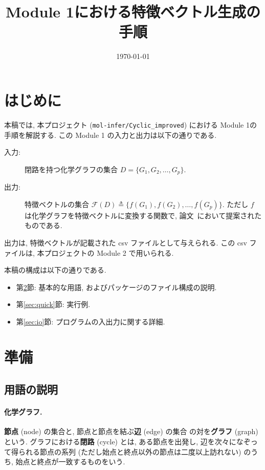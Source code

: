 \documentclass[11pt, titlepage, dvipdfmx, twoside]{jarticle}
\title{\huge Module 1における特徴ベクトル生成の手順}
\author{\project}
\newcommand{\project}{{\tt mol-infer/Cyclic\_improved}}
\newcommand{\secref}[1]{第\ref{sec:#1}節}
\begin{document}
\makeatletter 
\let\c@lstlisting\c@figure
\makeatother
{}
\date{\today}
\maketitle
\thispagestyle{empty}
\tableofcontents
\clearpage
{}


\section{はじめに}
本稿では, 本プロジェクト (\project) における Module 1の手順を解説する. 
この Module 1 の入力と出力は以下の通りである. 

\begin{oframed}
\begin{description}
\item[入力:] 閉路を持つ化学グラフの集合 $D=\{G_1,G_2,\dots,G_p\}$. 
\item[出力:] 特徴ベクトルの集合 ${\mathcal F}(D)\triangleq\{f(G_1),f(G_2),\dots,f(G_p)\}$.
  ただし $f$ は化学グラフを特徴ベクトルに変換する関数で,
  論文~\cite{BH_cyclic_arxiv}において提案されたものである. 
\end{description}
\end{oframed}
出力は, 特徴ベクトルが記載された csv ファイルとして与えられる.
この csv ファイルは, 本プロジェクトの Module 2 で用いられる. 

本稿の構成は以下の通りである. 
\begin{itemize}
\item \secref{preparation}: 基本的な用語, およびパッケージのファイル構成の説明. 
\item \secref{quick}: 実行例. 
\item \secref{io}: プログラムの入出力に関する詳細. 
\end{itemize}

\clearpage
\section{準備}
\label{sec:preparation}

\subsection{用語の説明}
\paragraph{化学グラフ.}
{\bf 節点} (node) の集合と, 節点と節点を結ぶ{\bf 辺} (edge) の集合
の対を{\bf グラフ} (graph) という.
グラフにおける{\bf 閉路} (cycle) とは,
ある節点を出発し, 辺を次々になぞって得られる節点の系列
(ただし始点と終点以外の節点は二度以上訪れない) のうち, 始点と終点が一致するものをいう.
\end{document}
